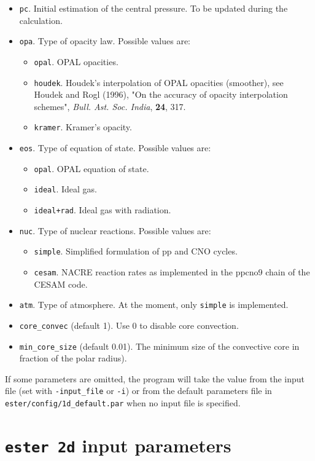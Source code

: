 \begin{itemize}
\item {\tt pc}. Initial estimation of the central pressure. To be updated during the
calculation.
\item {\tt opa}. Type of opacity law. Possible values are:
\begin{itemize}
\item {\tt opal}. OPAL opacities.
\item {\tt houdek}. Houdek's interpolation of OPAL opacities (smoother),
see Houdek and Rogl (1996), "On the accuracy of opacity interpolation
schemes", {\it Bull. Ast. Soc. India}, {\bf 24}, 317.
\item {\tt kramer}. Kramer's opacity.
\end{itemize}
\item {\tt eos}. Type of equation of state. Possible values are:
\begin{itemize}
\item {\tt opal}. OPAL equation of state.
\item {\tt ideal}. Ideal gas.
\item {\tt ideal+rad}. Ideal gas with radiation.
\end{itemize}
\item {\tt nuc}. Type of nuclear reactions. Possible values are:
\begin{itemize}
\item {\tt simple}. Simplified formulation of pp and CNO cycles. 
\item {\tt cesam}. NACRE reaction rates as implemented in the ppcno9 chain of the CESAM code.
\end{itemize}
\item {\tt atm}. Type of atmosphere. At the moment, only {\tt simple} is implemented.
\item {\tt core\_convec} (default 1). Use 0 to disable core convection.
\item {\tt min\_core\_size} (default 0.01). The minimum size of the convective core
in fraction of the polar radius).
\end{itemize}
If some parameters are omitted, the program will take the value from the input file (set with
{\tt -input\_file} or {\tt -i}) or from the default parameters file in 
{\tt ester/config/1d\_default.par} when no input file is specified.


\section{{\tt ester 2d} input parameters}

